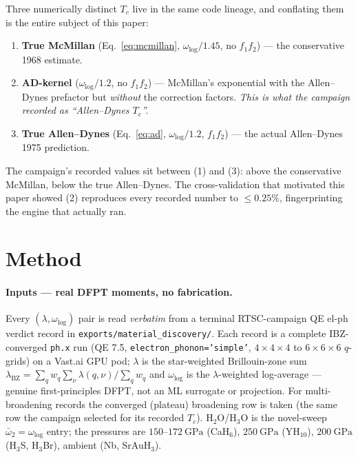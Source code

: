 \documentclass[11pt,a4paper]{article}
\begin{document}
Three numerically distinct $T_c$ live in the same code lineage, and conflating
them is the entire subject of this paper:
\begin{enumerate}\itemsep0.2em
\item \textbf{True McMillan} (Eq.~\ref{eq:mcmillan}, $\omega_{\log}/1.45$, no
  $f_1 f_2$) --- the conservative 1968 estimate.
\item \textbf{AD-kernel} ($\omega_{\log}/1.2$, no $f_1 f_2$) --- McMillan's
  exponential with the Allen--Dynes prefactor but \emph{without} the
  correction factors. \emph{This is what the campaign recorded as
  ``Allen--Dynes $T_c$''.}
\item \textbf{True Allen--Dynes} (Eq.~\ref{eq:ad}, $\omega_{\log}/1.2$,
  $f_1 f_2$) --- the actual Allen--Dynes 1975 prediction.
\end{enumerate}
The campaign's recorded values sit between (1) and (3): above the conservative
McMillan, below the true Allen--Dynes. The cross-validation that motivated this
paper showed (2) reproduces every recorded number to $\le 0.25\%$, fingerprinting
the engine that actually ran.

\section{Method}
\label{sec:method}

\paragraph{Inputs --- real DFPT moments, no fabrication.}
Every $(\lambda,\omega_{\log})$ pair is read \emph{verbatim} from a terminal
RTSC-campaign QE el-ph verdict record in
\texttt{exports/material\_discovery/}. Each record is a complete
IBZ-converged \texttt{ph.x} run (QE 7.5, \texttt{electron\_phonon='simple'},
$4\times4\times4$ to $6\times6\times6$ $q$-grids) on a Vast.ai GPU pod;
$\lambda$ is the star-weighted Brillouin-zone sum
$\lambda_{\mathrm{BZ}}=\sum_q w_q \sum_\nu \lambda(q,\nu)/\sum_q w_q$ and
$\omega_{\log}$ is the $\lambda$-weighted log-average --- genuine
first-principles DFPT, not an ML surrogate or projection. For multi-broadening
records the converged (plateau) broadening row is taken (the same row the
campaign selected for its recorded $T_c$). H$_2$O/H$_3$O is the novel-sweep
$\bar\omega_2{=}\omega_{\log}$ entry; the pressures are
$150$--$\SI{172}{\giga\pascal}$ (CaH$_6$), $\SI{250}{\giga\pascal}$
(YH$_{10}$), $\SI{200}{\giga\pascal}$ (H$_3$S, H$_3$Br), ambient (Nb,
SrAuH$_3$).
\end{document}
